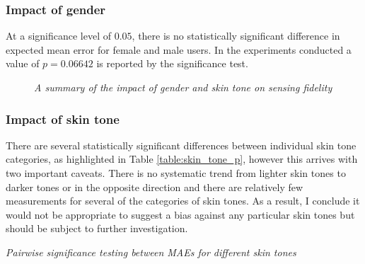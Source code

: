 



\subsubsection{Impact of gender}
At a significance level of $0.05$, there is no statistically significant difference in expected mean error for female and male users. In the experiments conducted a value of $p=0.06642$ is reported by the significance test.
\begin{figure}[H]
    \centering
    \quad
    \quad
    \quad
    \caption{\textit{A summary of the impact of gender and skin tone on sensing fidelity}}
\end{figure}

\subsubsection{Impact of skin tone}
There are several statistically significant differences between individual skin tone categories, as highlighted in Table \ref{table:skin_tone_p}, however this arrives with two important caveats.
There is no systematic trend from lighter skin tones to darker tones or in the opposite direction and there are relatively few measurements for several of the categories of skin tones.
As a result, I conclude it would not be appropriate to suggest a bias against any particular skin tones but should be subject to further investigation.
\begin{table}[H]
    \centering
    \scalebox{0.7}{}
    \caption{\textit{Pairwise significance testing between MAEs for different skin tones}}
    \label{table:skin_tone_p}
\end{table}

